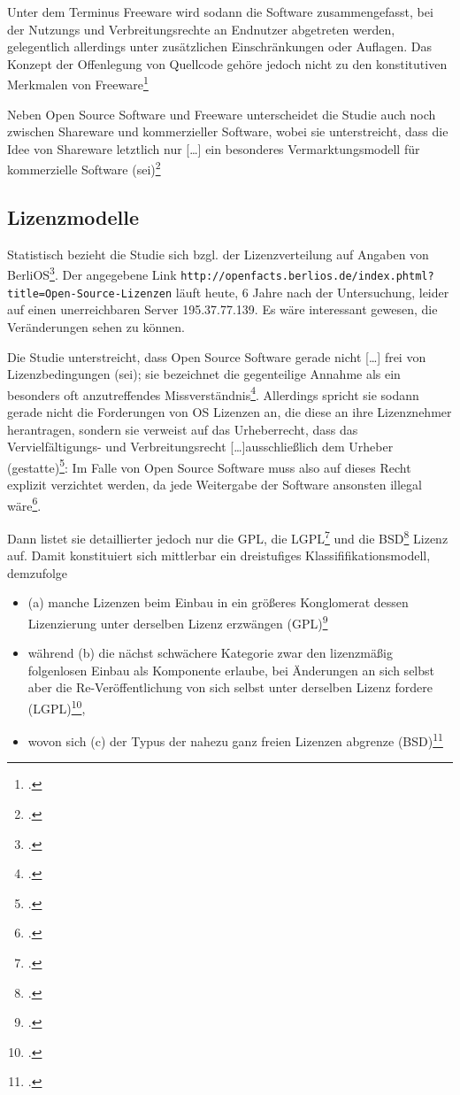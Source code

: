 \documentclass[DIV=calc,BCOR=5mm,11pt,headings=small,oneside,abstract=true, toc=bib]{scrartcl}
\begin{document}
Unter dem Terminus \glqq{}Freeware\grqq{} wird sodann die Software
zusammengefasst, bei der Nutzungs und Verbreitungsrechte an Endnutzer abgetreten
werden, gelegentlich allerdings unter zusätzlichen Einschränkungen oder
Auflagen. Das Konzept der Offenlegung von Quellcode gehöre jedoch nicht zu den
konstitutiven Merkmalen von
\glqq{}Freeware\grqq{}\footcite[vgl.][14]{RenVetRexKet2005a}

Neben Open Source Software und Freeware unterscheidet die Studie auch noch
zwischen \glqq{}Shareware\grqq{} und \glqq{}kommerzieller Software\grqq{}, wobei
sie unterstreicht, dass die Idee von Shareware letztlich nur \glqq{}[\ldots] ein
besonderes Vermarktungsmodell für kommerzielle Software
(sei)\grqq{}\footcite[vgl.][14f]{RenVetRexKet2005a}

\subsection{Lizenzmodelle}

Statistisch bezieht die Studie sich bzgl. der Lizenzverteilung auf Angaben von
BerliOS\grqq{}\footcite[vgl.][22]{RenVetRexKet2005a}. Der angegebene Link 
\texttt{http://openfacts.berlios.de/index.phtml?title=Open-Source-Lizenzen}
läuft heute, 6 Jahre nach der Untersuchung, leider auf einen unerreichbaren
Server 195.37.77.139. Es wäre interessant gewesen, die Veränderungen sehen zu
können.

Die Studie unterstreicht, dass \glqq{}Open Source Software\grqq{} gerade nicht
\glqq{}[\ldots] frei von Lizenzbedingungen (sei)\grqq{}; sie bezeichnet die
gegenteilige Annahme als \glqq{}ein besonders oft anzutreffendes
Missverständnis\grqq{}\footcite[vgl.][19]{RenVetRexKet2005a}. Allerdings spricht
sie sodann gerade nicht die Forderungen von OS Lizenzen an, die diese an ihre
Lizenznehmer herantragen, sondern sie verweist auf das Urheberrecht, dass
das Vervielfältigungs- und Verbreitungsrecht \glqq{}[\ldots]ausschließlich dem
Urheber (gestatte)\grqq{}\footcite[vgl.][19]{RenVetRexKet2005a}:
\glqq{}Im Falle von Open Source Software muss also auf dieses Recht
explizit verzichtet werden, da jede Weitergabe der Software ansonsten
illegal wäre\grqq{}\footcite[][19f]{RenVetRexKet2005a}.

Dann listet sie detaillierter jedoch nur die
GPL, die
LGPL\footcite[vgl.][21]{RenVetRexKet2005a} und die
BSD\footcite[vgl.][21]{RenVetRexKet2005a} Lizenz auf. Damit konstituiert sich
mittlerbar ein dreistufiges Klassififikationsmodell, demzufolge 
\begin{itemize}
  \item (a) manche Lizenzen beim Einbau in ein größeres Konglomerat dessen
  Lizenzierung unter derselben Lizenz erzwängen
  (GPL)\footcite[vgl.][20]{RenVetRexKet2005a}
  \item während (b) die nächst schwächere Kategorie zwar den lizenzmäßig
  folgenlosen Einbau als Komponente erlaube, bei Änderungen an sich selbst aber
  die Re-Veröffentlichung von sich selbst unter derselben Lizenz fordere
  (LGPL)\footcite[vgl.][21]{RenVetRexKet2005a},
  \item wovon sich (c) der Typus der nahezu ganz freien Lizenzen abgrenze
  (BSD)\footcite[vgl.][21]{RenVetRexKet2005a}
\end{itemize}
\end{document}
